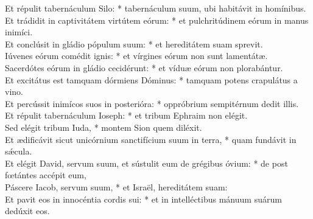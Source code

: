 {	Et répulit tabernáculum Silo: * tabernáculum suum, ubi habitávit in homínibus. \\
	Et trádidit in captivitátem virtútem eórum: * et pulchritúdinem eórum in manus inimíci. \\
	Et conclúsit in gládio pópulum suum: * et hereditátem suam sprevit. \\
	Iúvenes eórum comédit ignis: * et vírgines eórum non sunt lamentátæ. \\
	Sacerdótes eórum in gládio cecidérunt: * et víduæ eórum non plorabántur. \\
	Et excitátus est tamquam dórmiens Dóminus: * tamquam potens crapulátus a vino. \\
	Et percússit inimícos suos in posterióra: * oppróbrium sempitérnum dedit illis. \\
	Et répulit tabernáculum Ioseph: * et tribum Ephraim non elégit. \\
	Sed elégit tribum Iuda, * montem Sion quem diléxit. \\
	Et ædificávit sicut unicórnium sanctifícium suum in terra, * quam fundávit in sǽcula. \\
	Et elégit David, servum suum, et sústulit eum de grégibus óvium: * de post fœtántes accépit eum, \\
	Páscere Iacob, servum suum, * et Israël, hereditátem suam: \\
	Et pavit eos in innocéntia cordis sui: * et in intelléctibus mánuum suárum dedúxit eos.
}

